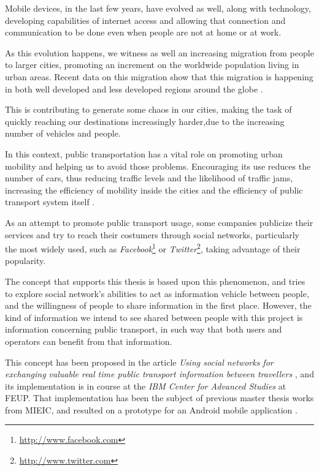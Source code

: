 Mobile devices, in the last few years, have evolved as well, along with technology, developing capabilities of internet access and allowing that connection and communication to be done even when people are not at home or at work.

As this evolution happens, we witness as well an increasing migration from people to larger cities, promoting an increment on the worldwide population living in urban areas. Recent data on this migration show that this migration is happening in both well developed and less developed regions around the globe \cite{kn:NAT11}.

This is contributing to generate some chaos in our cities, making the task of quickly reaching our destinations increasingly harder,due to the increasing number of vehicles and people.

In this context, public transportation has a vital role on promoting urban mobility and helping us to avoid those problems. Encouraging its use reduces the number of cars, thus reducing traffic levels and the likelihood of traffic jams, increasing the efficiency of mobility inside the cities and the efficiency of public transport system itself \cite{kn:CSV11}.

As an attempt to promote public transport usage, some companies publicize their services and try to reach their costumers through social networks, particularly the most widely used, such as \emph{Facebook}\footnote{\url{http://www.facebook.com}} or \emph{Twitter}\footnote{\url{http://www.twitter.com}}, taking advantage of their popularity.

The concept that supports this thesis is based upon this phenomenon, and tries to explore social network's abilities to act as information vehicle between people, and the willingness of people to share information in the first place. However, the kind of information we intend to see shared between people with this project is information concerning public transport, in such way that both users and operators can benefit from that information. 

This concept has been proposed in the article \emph{Using social networks for exchanging valuable real time public transport information between travellers} \cite{kn:NGeCP11}, and its implementation is in course at the \emph{IBM Center for Advanced Studies} at FEUP. That implementation has been the subject of previous master thesis works from MIEIC, and resulted on a prototype for an Android mobile application \cite{kn:eSG12}. 

